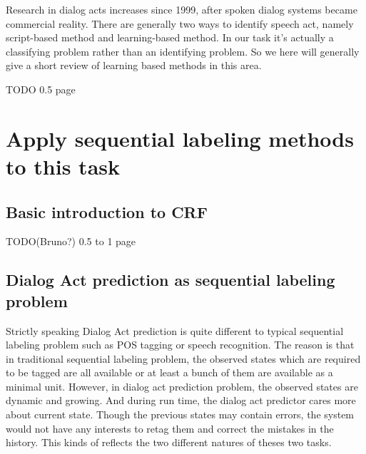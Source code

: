 \documentclass[a4paper]{article}
\begin{document}
Research in dialog acts increases since 1999, after spoken dialog  systems became commercial reality. There are generally two ways to identify speech act, namely script-based method and learning-based method. In our task it's actually a classifying problem rather than an identifying problem. So we here will generally give a short review of learning based methods in this area.

TODO
0.5 page
\section{Apply sequential labeling methods to this task}
\subsection{Basic introduction to CRF}
TODO(Bruno?)
0.5 to 1 page
\subsection{Dialog Act prediction as sequential labeling problem}
Strictly speaking Dialog Act prediction is quite different to typical sequential labeling problem such as POS tagging or speech recognition. The reason is that in traditional sequential labeling problem, the observed states which are required to be tagged are all available or at least a bunch of them are available as a minimal unit. However, in dialog act prediction problem, the observed states are dynamic and growing. And during run time, the dialog act predictor cares more about current state. Though the previous states may contain errors, the system would not have any interests to retag them and correct the mistakes in the history. This kinds of reflects the two different natures of theses two tasks.
\end{document}
